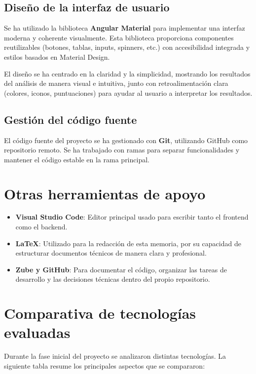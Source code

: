 \subsection{Diseño de la interfaz de usuario}

Se ha utilizado la biblioteca \textbf{Angular Material} para implementar una interfaz moderna y coherente visualmente. Esta biblioteca proporciona componentes reutilizables (botones, tablas, inputs, spinners, etc.) con accesibilidad integrada y estilos basados en Material Design.

El diseño se ha centrado en la claridad y la simplicidad, mostrando los resultados del análisis de manera visual e intuitiva, junto con retroalimentación clara (colores, iconos, puntuaciones) para ayudar al usuario a interpretar los resultados.

\subsection{Gestión del código fuente}

El código fuente del proyecto se ha gestionado con \textbf{Git}, utilizando GitHub como repositorio remoto. Se ha trabajado con ramas para separar funcionalidades y mantener el código estable en la rama principal.

\section{Otras herramientas de apoyo}

\begin{itemize}
  \item \textbf{Visual Studio Code}: Editor principal usado para escribir tanto el frontend como el backend.
  \item \textbf{LaTeX}: Utilizado para la redacción de esta memoria, por su capacidad de estructurar documentos técnicos de manera clara y profesional.
  \item \textbf{Zube y GitHub}: Para documentar el código, organizar las tareas de desarrollo y las decisiones técnicas dentro del propio repositorio.
\end{itemize}

\section{Comparativa de tecnologías evaluadas}

Durante la fase inicial del proyecto se analizaron distintas tecnologías. La siguiente tabla resume los principales aspectos que se compararon:

